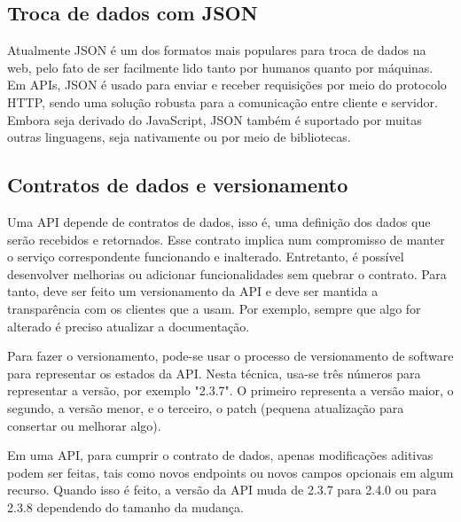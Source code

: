 \subsection{Troca de dados com JSON}
Atualmente JSON é um dos formatos mais populares para troca de dados na web, pelo fato de ser facilmente lido tanto por humanos quanto por máquinas. Em APIs, JSON é usado para enviar e receber requisições por meio do protocolo HTTP, sendo uma solução robusta para a comunicação entre cliente e servidor. Embora seja derivado do JavaScript, JSON também é suportado por muitas outras linguagens, seja nativamente ou por meio de bibliotecas.  \cite{json_bourhis_2020}



\subsection{Contratos de dados e versionamento}
Uma API depende de contratos de dados, isso é, uma definição dos dados que serão recebidos e retornados. Esse contrato implica num compromisso de manter o serviço correspondente funcionando e inalterado. Entretanto, é possível desenvolver melhorias ou adicionar funcionalidades sem quebrar o contrato. Para tanto, deve ser feito um versionamento da API e deve ser mantida a transparência com os clientes que a usam. Por exemplo, sempre que algo for alterado é preciso atualizar a documentação.

Para fazer o versionamento, pode-se usar o processo de versionamento de software para representar os estados da API. Nesta técnica, usa-se três números para representar a versão, por exemplo "2.3.7". O primeiro representa a versão maior, o segundo, a versão menor, e o terceiro, o patch (pequena atualização para consertar ou melhorar algo). \cite{wiki_software_versioning_2022}

Em uma API, para cumprir o contrato de dados, apenas modificações aditivas podem ser feitas, tais como novos endpoints ou novos campos opcionais em algum recurso. Quando isso é feito, a versão da API muda de 2.3.7 para 2.4.0 ou para 2.3.8 dependendo do tamanho da mudança.

